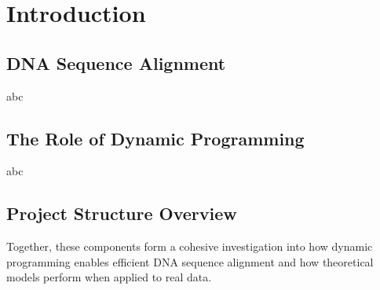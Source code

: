 \section{Introduction}

\subsection{DNA Sequence Alignment}

abc

\subsection{The Role of Dynamic Programming}

abc

\subsection{Project Structure Overview}

Together, these components form a cohesive investigation into how dynamic programming enables efficient DNA sequence alignment and how theoretical models perform when applied to real data.
